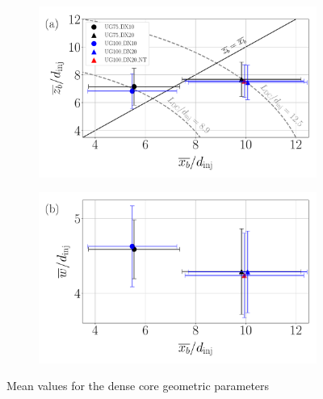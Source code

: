 \begin{figure}[ht]
\flushleft
\begin{subfigure}[b]{0.45\textwidth}
	\centering
   \includegraphics[scale=0.25]{./part2_developments/figures_ch5_resolved_JICF/results_dense_core_modeling/map_xb_zb}
   \label{fig:dense_core_mean_parameters_scatterplots_zb_xb}
\end{subfigure}
\hspace{0.25in}
\begin{subfigure}[b]{0.45\textwidth}
	\centering
   \includegraphics[scale=0.25]{./part2_developments/figures_ch5_resolved_JICF/results_dense_core_modeling/map_xb_width}
   \label{fig:dense_core_mean_parameters_scatterplots_w_xb}
\end{subfigure}
   \vspace*{-0.30in}
\caption{Mean values for the dense core geometric parameters}
\label{fig:dense_core_mean_parameters_scatterplots}
\end{figure}


